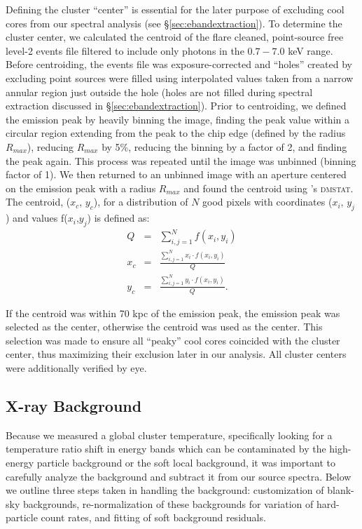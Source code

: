 Defining the cluster ``center'' is essential for the later purpose of
excluding cool cores from our spectral analysis (see
\S\ref{sec:ebandextraction}). To determine the cluster center, we
calculated the centroid of the flare cleaned, point-source free
level-2 events file filtered to include only photons in the $0.7-7.0$
keV range. Before centroiding, the events file was exposure-corrected
and ``holes'' created by excluding point sources were filled using
interpolated values taken from a narrow annular region just outside
the hole (holes are not filled during spectral extraction discussed in
\S\ref{sec:ebandextraction}). Prior to centroiding, we defined the emission
peak by heavily binning the image, finding the peak value within a
circular region extending from the peak to the chip edge (defined by
the radius $R_{max}$), reducing $R_{max}$ by 5\%, reducing the binning
by a factor of 2, and finding the peak again. This process was
repeated until the image was unbinned (binning factor of 1). We then
returned to an unbinned image with an aperture centered on the
emission peak with a radius $R_{max}$ and found the centroid using
\ciao's {\textsc{dmstat}}. The centroid, ($x_c$, $y_c$), for a
distribution of $N$ good pixels with coordinates ($x_i$, $y_j$) and
values f($x_i$,$y_j$) is defined as:
\begin{eqnarray}
Q &=& \sum_{i,j=1}^N f(x_i,y_i) \\
x_c &=& \frac{\sum_{i,j=1}^N x_i \cdot f(x_i,y_i)}{Q} \nonumber \\
y_c &=& \frac{\sum_{i,j=1}^N y_i \cdot f(x_i,y_i)}{Q}. \nonumber
\end{eqnarray}

If the centroid was within 70 kpc of the emission peak, the emission
peak was selected as the center, otherwise the centroid was used as
the center. This selection was made to ensure all ``peaky'' cool cores
coincided with the cluster center, thus maximizing their exclusion
later in our analysis. All cluster centers were additionally verified
by eye.

\subsection{X-ray Background}
\label{sec:ebandbackground}

Because we measured a global cluster temperature, specifically looking
for a temperature ratio shift in energy bands which can be
contaminated by the high-energy particle background or the soft local
background, it was important to carefully analyze the background and
subtract it from our source spectra. Below we outline three steps
taken in handling the background: customization of blank-sky
backgrounds, re-normalization of these backgrounds for variation of
hard-particle count rates, and fitting of soft background residuals.


